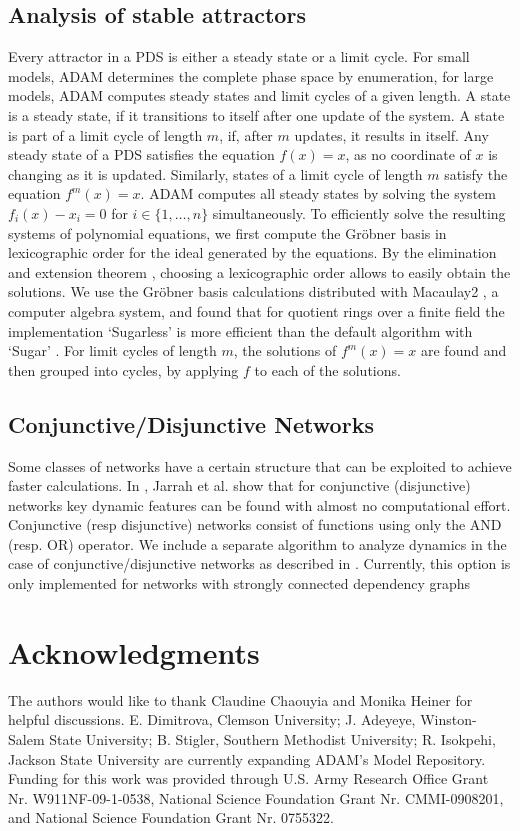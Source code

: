\documentclass[11pt]{amsart}
\begin{document}
\subsection{Analysis of stable attractors}
Every attractor in a PDS is either a
steady state or a limit cycle. For small models, ADAM determines the complete
phase space by enumeration, for large models, ADAM computes steady states and
limit cycles of a given length.
A state is a steady state, if it transitions to itself after one update of the
system. A state is part of a limit cycle of length $m$, if,
after $m$ updates, it results in itself. Any steady state of a PDS satisfies
the equation $f(x) = x$, as no coordinate of $x$ is changing as it is updated.
Similarly, states of a
limit cycle of length $m$ satisfy the equation $f^m(x) = x$. ADAM computes all
steady states by solving the system $f_i(x) - x_i = 0$ for $i \in \{1, \ldots,
n\}$ simultaneously. To efficiently solve the resulting systems of polynomial
equations, we first compute the Gr\"obner
basis in lexicographic order for the ideal generated by the equations.
By the elimination and extension theorem \cite{IVA}, choosing a lexicographic order
allows to easily obtain the solutions.
We use the Gr\"obner basis calculations distributed with Macaulay2 \cite{M2}, a
computer algebra system, and found that for quotient rings over a finite field
the implementation `Sugarless' is more efficient than the default algorithm
with `Sugar' \cite{Sugar:1991}.
For limit cycles of length $m$, the solutions of $f^m(x)=x$ are found and then
grouped into cycles, by applying $f$ to each of the solutions.
\subsection{Conjunctive/Disjunctive Networks} \label{sec:conj}
Some classes of networks have a certain structure that can be
exploited to achieve faster calculations. In \cite{conjunctive}, Jarrah et al.
show that for conjunctive (disjunctive) networks key dynamic features can be found with
almost no computational effort. Conjunctive (resp disjunctive) networks consist of
functions using only the AND (resp. OR) operator.
We include a separate algorithm to analyze
dynamics in the case of conjunctive/disjunctive networks as described in
\cite{conjunctive}. Currently,
this option is only implemented for networks with strongly connected dependency graphs
\section*{Acknowledgments}
The authors would like to thank Claudine Chaouyia and Monika Heiner for helpful discussions. E. Dimitrova, Clemson University; J. Adeyeye, Winston-Salem State University; B. Stigler, Southern Methodist University; R. Isokpehi, Jackson State University are currently expanding ADAM’s Model Repository.
Funding for this work was provided through U.S. Army Research Office Grant Nr. W911NF-09-1-0538,
National Science Foundation Grant Nr. CMMI-0908201, and National Science Foundation Grant Nr. 0755322.



%

\end{document}
